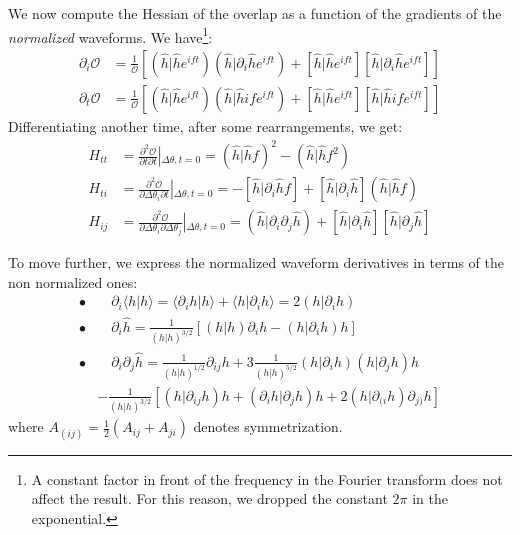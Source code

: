 \documentclass[twocolumn,showpacs,preprintnumbers,nofootinbib,prd,
superscriptaddress,10pt]{revtex4-2}
\newcommand{\scalar}[2]{\langle #1|#2 \rangle}
\newcommand{\rescalar}[2]{( #1|#2 )}
\newcommand{\imscalar}[2]{[ #1|#2 ]}
\begin{document}
We now compute the Hessian of the overlap as a function of the gradients of the {\it normalized} waveforms.
We have\footnote{
A constant factor in front of the frequency in the Fourier transform does not affect the result. For this reason, we dropped the constant $2\pi$ in the exponential.}:
\begin{align}
	\partial_i \mathcal{O} &= \frac{1}{\mathcal{O}} \left[ \rescalar{\hat{h}}{\hat{h}e^{ift}}\rescalar{\hat{h}}{\partial_i\hat{h}e^{ift}} + \imscalar{\hat{h}}{\hat{h}e^{ift}}\imscalar{\hat{h}}{\partial_i\hat{h}e^{ift}} \right]\\
	\partial_t \mathcal{O} &= \frac{1}{\mathcal{O}} \left[ \rescalar{\hat{h}}{\hat{h}e^{ift}}\rescalar{\hat{h}}{\hat{h}if e^{ift}} + \imscalar{\hat{h}}{\hat{h}e^{ift}}\imscalar{\hat{h}}{\hat{h}if e^{ift}} \right]
\end{align}
Differentiating another time, after some rearrangements, we get:
\begin{align}
H_{tt} &= \frac{\partial^2 \mathcal{O}}{\partial t \partial t } \left|_{\Delta\theta, t = 0} \right.
								= \rescalar{\hat{h}}{\hat{h}f}^2 - \rescalar{\hat{h}}{\hat{h}f^2} \label{eq:H_tt}\\
H_{ti} &= \frac{\partial^2 \mathcal{O}}{\partial \Delta \theta_i \partial t } \left|_{\Delta\theta, t = 0} \right.
								= - \imscalar{\hat{h}}{\partial_i \hat{h}f} + \imscalar{\hat{h}}{\partial_i\hat{h}} \rescalar{\hat{h}}{\hat{h}f} \label{eq:H_ti}\\
H_{ij} &= \frac{\partial^2 \mathcal{O}}{\partial \Delta \theta_i \partial \Delta \theta_j }\left|_{\Delta\theta, t = 0} \right.
								= \rescalar{\hat{h}}{\partial_i\partial_j\hat{h}} +\imscalar{\hat{h}}{\partial_i\hat{h}} \imscalar{\hat{h}}{\partial_j\hat{h}} \label{eq:H_ij}
\end{align}

To move further, we express the normalized waveform derivatives in terms of the non normalized ones:
\begin{align*}
	\bullet&\quad \partial_i \scalar{h}{h} = \scalar{\partial_i h}{h}+ \scalar{h}{\partial_i h} = 2 \rescalar{h}{\partial_i h} \\
	\bullet&\quad \partial_i \hat{h} =\frac{1}{\rescalar{h}{h}^{3/2}} \left[ \rescalar{h}{h}\partial_i h -  \rescalar{h}{\partial_i h} h \right]	\\
	\bullet &\quad \partial_i \partial_j \hat{h} = \frac{1}{\rescalar{h}{h}^{1/2}} \partial_{ij}h 	+3 \frac{1}{\rescalar{h}{h}^{5/2}} \rescalar{h}{\partial_i h}\rescalar{h}{\partial_j h}h \\
	&- \frac{1}{\rescalar{h}{h}^{3/2}} \left[\rescalar{h}{ \partial_{ij} h} h + \rescalar{\partial_i h}{\partial_j h}  h
		+2\rescalar{h}{\partial_{(i} h} \partial_{j)} h \right]
\end{align*}
where $A_{(ij)} = \frac{1}{2}(A_{ij}+A_{ji})$ denotes symmetrization.
\end{document}
